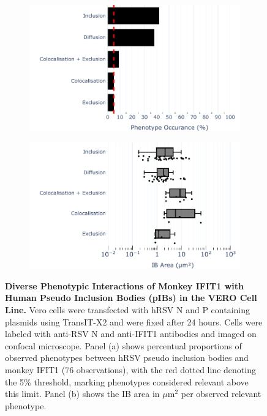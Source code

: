 \begin{figure}
    \begin{subfigure}{0.495\textwidth}
        \caption{}
        \includegraphics[width=1\linewidth]{09. Chapter 4/Figs/01. pIB/02. IFIT1/04. bar_i1_vero_hnhp.pdf} 
    \end{subfigure}
    \begin{subfigure}{0.495\textwidth}
        \caption{}
        \includegraphics[width=1\linewidth]{09. Chapter 4/Figs/01. pIB/02. IFIT1/05. box_i1_vero_hnhp.pdf}
    \end{subfigure}
    \caption[Diverse Phenotypic Interactions of Monkey IFIT1 with Human Pseudo Inclusion Bodies (pIBs) in the VERO Cell Line.]{\textbf{Diverse Phenotypic Interactions of Monkey IFIT1 with Human Pseudo Inclusion Bodies (pIBs) in the VERO Cell Line.} Vero cells were transfected with hRSV N and P containing plasmids using TransIT-X2 and were fixed after 24 hours. Cells were labeled with anti-RSV N and anti-IFIT1 antibodies and imaged on confocal microscope. Panel (a) shows percentual proportions of observed phenotypes between hRSV pseudo inclusion bodies and monkey IFIT1 (76 observations), with the red dotted line denoting the 5\% threshold, marking phenotypes considered relevant above this limit. Panel (b) shows the IB area in \(\mu \mbox{m}^2\) per observed relevant phenotype.}
    \label{fig:Diverse Phenotypic Interactions of Monkey IFIT1 with Human Pseudo Inclusion Bodies (pIBs) in the VERO Cell Line}
\end{figure}

